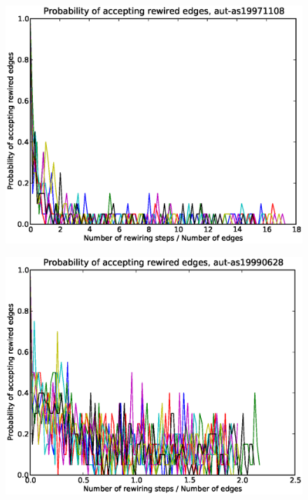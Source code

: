 \documentclass[12pt]{article}
\begin{document}
\begin{figure}[p]
\includegraphics[scale=0.75]{Paccept-aut-as19971108.eps}\\
\end{figure}

\begin{figure}[p]
\includegraphics[scale=0.75]{Paccept-aut-as19990628.eps}\\
\end{figure}
\end{document}
